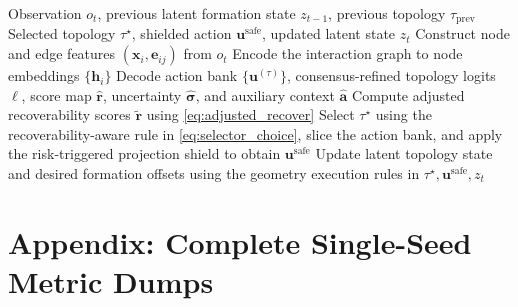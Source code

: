 \documentclass{ieeeaccess}
\newcommand{\bfu}{\mathbf{u}}
\begin{document}
\begin{algorithm}[H]
\caption{RVT-Swarm Decentralized Control Step}
\label{alg:online_pipeline}
\begin{algorithmic}[1]
\REQUIRE Observation $o_t$, previous latent formation state
$z_{t-1}$, previous topology $\tau_{\mathrm{prev}}$
\ENSURE Selected topology $\tau^\star$, shielded action
$\bfu^{\mathrm{safe}}$, updated latent state $z_t$
\STATE Construct node and edge features $(\mathbf{x}_i,\mathbf{e}_{ij})$
from $o_t$
\STATE Encode the interaction graph to node embeddings
$\{\mathbf{h}_i\}$
\STATE Decode action bank $\{\bfu^{(\tau)}\}$, consensus-refined
topology logits $\bm{\ell}$, score map $\hat{\mathbf{r}}$, uncertainty
$\hat{\bm{\sigma}}$, and auxiliary context $\hat{\mathbf{a}}$
\STATE Compute adjusted recoverability scores $\tilde{\mathbf{r}}$ using
\eqref{eq:adjusted_recover}
\STATE Select $\tau^\star$ using the recoverability-aware rule in
\eqref{eq:selector_choice}, slice the action bank, and apply the
risk-triggered projection shield to obtain $\bfu^{\mathrm{safe}}$
\STATE Update latent topology state and desired formation offsets using
the geometry execution rules in 
\RETURN $\tau^\star,\bfu^{\mathrm{safe}},z_t$
\end{algorithmic}
\end{algorithm}

\section*{Appendix: Complete Single-Seed Metric Dumps}
\end{document}
